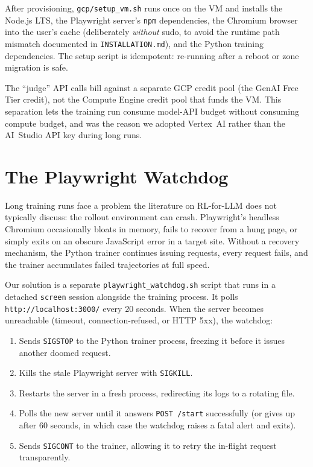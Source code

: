 \documentclass[12pt,a4paper]{report}
\begin{document}
After provisioning, \texttt{gcp/setup\_vm.sh} runs once on the VM and installs the Node.js LTS, the Playwright server's \texttt{npm} dependencies, the Chromium browser into the user's cache (deliberately \emph{without} sudo, to avoid the runtime path mismatch documented in \texttt{INSTALLATION.md}), and the Python training dependencies. The setup script is idempotent: re-running after a reboot or zone migration is safe.

The ``judge'' API calls bill against a separate GCP credit pool (the GenAI Free Tier credit), not the Compute Engine credit pool that funds the VM. This separation lets the training run consume model-API budget without consuming compute budget, and was the reason we adopted Vertex~AI rather than the AI~Studio API key during long runs.

\section{The Playwright Watchdog}\label{sec:impl-watchdog}

Long training runs face a problem the literature on RL-for-LLM does not typically discuss: the rollout environment can crash. Playwright's headless Chromium occasionally bloats in memory, fails to recover from a hung page, or simply exits on an obscure JavaScript error in a target site. Without a recovery mechanism, the Python trainer continues issuing requests, every request fails, and the trainer accumulates failed trajectories at full speed.

Our solution is a separate \texttt{playwright\_watchdog.sh} script that runs in a detached \texttt{screen} session alongside the training process. It polls \texttt{http://localhost:3000/} every 20 seconds. When the server becomes unreachable (timeout, connection-refused, or HTTP 5xx), the watchdog:
\begin{enumerate}
  \item Sends \texttt{SIGSTOP} to the Python trainer process, freezing it before it issues another doomed request.
  \item Kills the stale Playwright server with \texttt{SIGKILL}.
  \item Restarts the server in a fresh process, redirecting its logs to a rotating file.
  \item Polls the new server until it answers \texttt{POST /start} successfully (or gives up after 60 seconds, in which case the watchdog raises a fatal alert and exits).
  \item Sends \texttt{SIGCONT} to the trainer, allowing it to retry the in-flight request transparently.
\end{enumerate}
\end{document}
